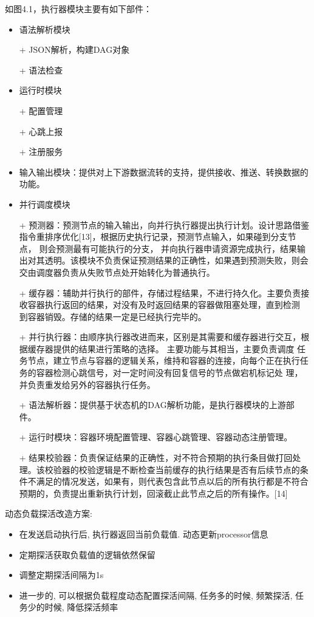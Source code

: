 如图4.1，执行器模块主要有如下部件：
\begin{itemize}
    \item 语法解析模块
    \item[+] JSON解析，构建DAG对象
    \item[+] 语法检查
    \item 运行时模块
    \item[+] 配置管理
    \item[+] 心跳上报
    \item[+] 注册服务
    \item 输入输出模块：提供对上下游数据流转的支持，提供接收、推送、转换数据的功能。
    \item 并行调度模块
    \item[+] 预测器：预测节点的输入输出，向并行执行器提出执行计划。设计思路借鉴指令重排序优化[13]，根据历史执行记录，预测节点输入，如果碰到分支节点，
    则会预测最有可能执行的分支， 并向执行器申请资源完成执行，结果输出对其透明。该模块不负责保证预测结果的正确性，如果遇到预测失败，则会
    交由调度器负责从失败节点处开始转化为普通执行。
    \item[+] 缓存器：辅助并行执行的部件，存储过程结果，不进行持久化。主要负责接收容器执行返回的结果，对没有及时返回结果的容器做阻塞处理，直到检测
    到容器销毁。存储的结果一定是已经执行完毕的。
    \item[+] 并行执行器：由顺序执行器改进而来，区别是其需要和缓存器进行交互，根据缓存器提供的结果进行策略的选择。 主要功能与其相当，主要负责调度
    任务节点，建立节点与容器的逻辑关系，维持和容器的连接，向每个正在执行任务的容器检测心跳信号，对一定时间没有回复信号的节点做宕机标记处
    理，并负责重发给另外的容器执行任务。
    \item[+] 语法解析器：提供基于状态机的DAG解析功能，是执行器模块的上游部件。
    \item[+] 运行时模块：容器环境配置管理、容器心跳管理、容器动态注册管理。
    \item[+] 结果校验器：负责保证结果的正确性，对不符合预期的执行条目做打回处理。该校验器的校验逻辑是不断检查当前缓存的执行结果是否有后续节点的条
    件不满足的情况发送，如果有，则代表包含此节点以后的所有执行都是不符合预期的，负责提出重新执行计划，回滚截止此节点之后的所有操作。[14]

\end{itemize}

动态负载探活改造方案:
\begin{itemize}
    \item 在发送启动执行后, 执行器返回当前负载值. 动态更新processor信息
    \item 定期探活获取负载值的逻辑依然保留
    \item 调整定期探活间隔为1s
    \item 进一步的, 可以根据负载程度动态配置探活间隔, 任务多的时候, 频繁探活, 任务少的时候, 降低探活频率
\end{itemize}


